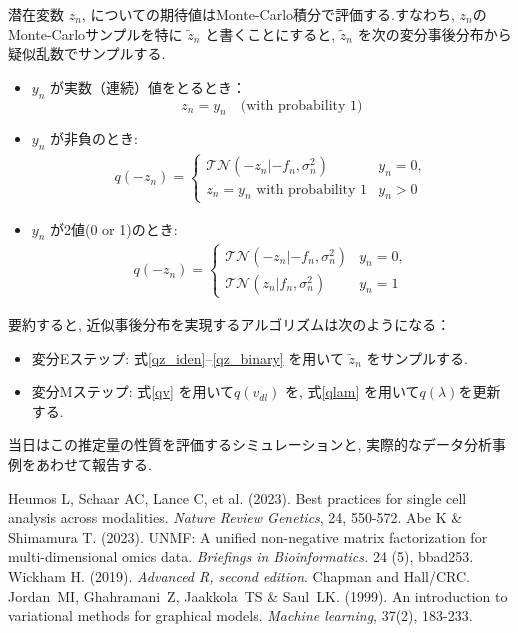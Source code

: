 \documentclass[a4paper,12ptc]{jsarticle} %
\begin{document}
潜在変数 $z_n$, についての期待値はMonte-Carlo積分で評価する.すなわち, $z_n$のMonte-Carloサンプルを特に $\tilde z_n$ と書くことにすると, $\tilde z_n$ を次の変分事後分布から疑似乱数でサンプルする. 
\begin{itemize}
\item $y_n$ が実数（連続）値をとるとき： 
\begin{equation}
z_n=y_n \quad \mbox{(with probability 1)}  \label{qz_iden}
\end{equation}
\item $y_n$ が非負のとき:
\begin{align}
q(-z_n) = \begin{cases}
    \mathcal{TN}(-z_n|-f_n, \sigma_n^2) & y_n=0,\\
    z_n = y_n \mbox{~with probability 1} & y_n>0
\end{cases} \label{qz_rect}
\end{align}
\item $y_n$ が2値(0 or 1)のとき:
\begin{align}
q(-z_n) = \begin{cases}
    \mathcal{TN}(-z_n|-f_n, \sigma_n^2) & y_n=0,\\
    \mathcal{TN}(z_n|f_n, \sigma_n^2) & y_n=1
\end{cases}\label{qz_binary}
\end{align}
\end{itemize}

要約すると, 近似事後分布を実現するアルゴリズムは次のようになる：
\begin{itemize}
\item 変分Eステップ: 式\ref{qz_iden}--\ref{qz_binary} を用いて $\tilde{z}_n$ をサンプルする.
\item 変分Mステップ:  式\ref{qv} を用いて$q(v_{dl})$ を, 式\ref{qlam} を用いて$q(\lambda)$を更新する. 
\end{itemize}

当日はこの推定量の性質を評価するシミュレーションと, 実際的なデータ分析事例をあわせて報告する.

\begin{thebibliography}{9}
 Heumos L, Schaar AC, Lance C, et al. (2023). Best practices for single cell analysis across modalities. {\em Nature Review Genetics}, 24, 550-572.
 Abe K \& Shimamura T. (2023). UNMF: A unified non-negative matrix factorization for multi-dimensional omics data. {\em Briefings in Bioinformatics.}  24 (5), bbad253.
 Wickham H. (2019).  {\em Advanced R, second edition}. Chapman and Hall/CRC.
 Jordan~MI, Ghahramani~Z, Jaakkola~TS \& Saul~LK. (1999). An introduction to variational methods for graphical models. {\em Machine learning}, 37(2), 183-233.
\end{thebibliography}
\end{document}
